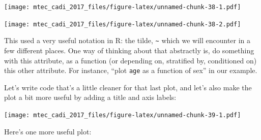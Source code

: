 \documentclass[12pt,]{book}
\newenvironment{Shaded}{\begin{snugshade}}{\end{snugshade}}
\newcommand{\KeywordTok}[1]{\textcolor[rgb]{0.13,0.29,0.53}{\textbf{#1}}}
\newcommand{\DataTypeTok}[1]{\textcolor[rgb]{0.13,0.29,0.53}{#1}}
\newcommand{\StringTok}[1]{\textcolor[rgb]{0.31,0.60,0.02}{#1}}
\newcommand{\CommentTok}[1]{\textcolor[rgb]{0.56,0.35,0.01}{\textit{#1}}}
\newcommand{\OperatorTok}[1]{\textcolor[rgb]{0.81,0.36,0.00}{\textbf{#1}}}
\newcommand{\NormalTok}[1]{#1}
\theoremstyle{definition}
\theoremstyle{definition}
\theoremstyle{remark}
\begin{document}
\texttt{[image: mtec\_cadi\_2017\_files/figure-latex/unnamed-chunk-38-1.pdf]}

\begin{Shaded}
\end{Shaded}

\texttt{[image: mtec\_cadi\_2017\_files/figure-latex/unnamed-chunk-38-2.pdf]}

This used a very useful notation in R: the tilde,
\texttt{\textasciitilde{}} which we will encounter in a few different
places. One way of thinking about that abstractly is, do something with
this attribute, as a function (or depending on, stratified by,
conditioned on) this other attribute. For instance, ``plot \texttt{age}
as a function of sex'' in our example.

Let's write code that's a little cleaner for that last plot, and let's
also make the plot a bit more useful by adding a title and axis labels:

\begin{Shaded}
\end{Shaded}

\texttt{[image: mtec\_cadi\_2017\_files/figure-latex/unnamed-chunk-39-1.pdf]}

Here's one more useful plot:

\begin{Shaded}
\end{Shaded}
\end{document}
